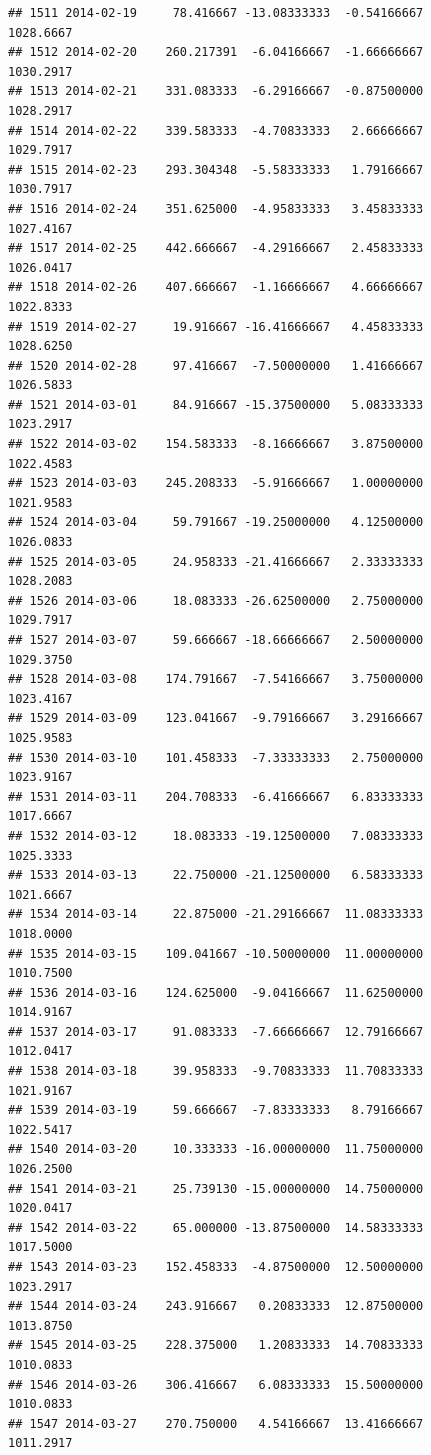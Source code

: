 \documentclass[
]{article}
\begin{document}
\begin{verbatim}
## 1511 2014-02-19     78.416667 -13.08333333  -0.54166667    1028.6667
## 1512 2014-02-20    260.217391  -6.04166667  -1.66666667    1030.2917
## 1513 2014-02-21    331.083333  -6.29166667  -0.87500000    1028.2917
## 1514 2014-02-22    339.583333  -4.70833333   2.66666667    1029.7917
## 1515 2014-02-23    293.304348  -5.58333333   1.79166667    1030.7917
## 1516 2014-02-24    351.625000  -4.95833333   3.45833333    1027.4167
## 1517 2014-02-25    442.666667  -4.29166667   2.45833333    1026.0417
## 1518 2014-02-26    407.666667  -1.16666667   4.66666667    1022.8333
## 1519 2014-02-27     19.916667 -16.41666667   4.45833333    1028.6250
## 1520 2014-02-28     97.416667  -7.50000000   1.41666667    1026.5833
## 1521 2014-03-01     84.916667 -15.37500000   5.08333333    1023.2917
## 1522 2014-03-02    154.583333  -8.16666667   3.87500000    1022.4583
## 1523 2014-03-03    245.208333  -5.91666667   1.00000000    1021.9583
## 1524 2014-03-04     59.791667 -19.25000000   4.12500000    1026.0833
## 1525 2014-03-05     24.958333 -21.41666667   2.33333333    1028.2083
## 1526 2014-03-06     18.083333 -26.62500000   2.75000000    1029.7917
## 1527 2014-03-07     59.666667 -18.66666667   2.50000000    1029.3750
## 1528 2014-03-08    174.791667  -7.54166667   3.75000000    1023.4167
## 1529 2014-03-09    123.041667  -9.79166667   3.29166667    1025.9583
## 1530 2014-03-10    101.458333  -7.33333333   2.75000000    1023.9167
## 1531 2014-03-11    204.708333  -6.41666667   6.83333333    1017.6667
## 1532 2014-03-12     18.083333 -19.12500000   7.08333333    1025.3333
## 1533 2014-03-13     22.750000 -21.12500000   6.58333333    1021.6667
## 1534 2014-03-14     22.875000 -21.29166667  11.08333333    1018.0000
## 1535 2014-03-15    109.041667 -10.50000000  11.00000000    1010.7500
## 1536 2014-03-16    124.625000  -9.04166667  11.62500000    1014.9167
## 1537 2014-03-17     91.083333  -7.66666667  12.79166667    1012.0417
## 1538 2014-03-18     39.958333  -9.70833333  11.70833333    1021.9167
## 1539 2014-03-19     59.666667  -7.83333333   8.79166667    1022.5417
## 1540 2014-03-20     10.333333 -16.00000000  11.75000000    1026.2500
## 1541 2014-03-21     25.739130 -15.00000000  14.75000000    1020.0417
## 1542 2014-03-22     65.000000 -13.87500000  14.58333333    1017.5000
## 1543 2014-03-23    152.458333  -4.87500000  12.50000000    1023.2917
## 1544 2014-03-24    243.916667   0.20833333  12.87500000    1013.8750
## 1545 2014-03-25    228.375000   1.20833333  14.70833333    1010.0833
## 1546 2014-03-26    306.416667   6.08333333  15.50000000    1010.0833
## 1547 2014-03-27    270.750000   4.54166667  13.41666667    1011.2917

\end{verbatim}
\end{document}
